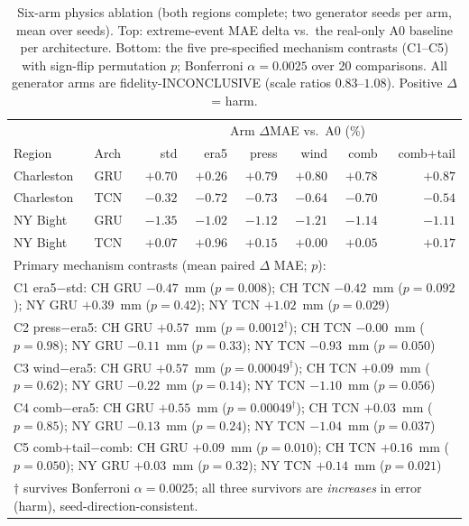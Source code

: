 \begin{table}[t]
\centering
\caption{Six-arm physics ablation (both regions complete; two generator
seeds per arm, mean over seeds). Top: extreme-event MAE delta vs.\ the
real-only A0 baseline per architecture. Bottom: the five pre-specified
mechanism contrasts (C1--C5) with sign-flip permutation $p$; Bonferroni
$\alpha=0.0025$ over 20 comparisons. All generator arms are fidelity-INCONCLUSIVE
(scale ratios $0.83$--$1.08$). Positive $\Delta$ = harm.}
\label{tab:physics-ablation}
\small
\begin{tabular}{llrrrrrr}
\toprule
& & \multicolumn{6}{c}{Arm $\Delta$MAE vs.\ A0 (\%)} \\
Region & Arch & std & era5 & press & wind & comb & comb+tail \\
\midrule
Charleston & GRU & $+0.70$ & $+0.26$ & $+0.79$ & $+0.80$ & $+0.78$ & $+0.87$ \\
Charleston & TCN & $-0.32$ & $-0.72$ & $-0.73$ & $-0.64$ & $-0.70$ & $-0.54$ \\
NY Bight   & GRU & $-1.35$ & $-1.02$ & $-1.12$ & $-1.21$ & $-1.14$ & $-1.11$ \\
NY Bight   & TCN & $+0.07$ & $+0.96$ & $+0.15$ & $+0.00$ & $+0.05$ & $+0.17$ \\
\midrule
\multicolumn{8}{l}{Primary mechanism contrasts (mean paired $\Delta$ MAE; $p$):}\\
\multicolumn{8}{l}{C1 era5$-$std: CH GRU $-0.47$~mm ($p{=}0.008$); CH TCN $-0.42$~mm ($p{=}0.092$); NY GRU $+0.39$~mm ($p{=}0.42$); NY TCN $+1.02$~mm ($p{=}0.029$)}\\
\multicolumn{8}{l}{C2 press$-$era5: CH GRU $+0.57$~mm ($p{=}0.0012^{\dagger}$); CH TCN $-0.00$~mm ($p{=}0.98$); NY GRU $-0.11$~mm ($p{=}0.33$); NY TCN $-0.93$~mm ($p{=}0.050$)}\\
\multicolumn{8}{l}{C3 wind$-$era5: CH GRU $+0.57$~mm ($p{=}0.00049^{\dagger}$); CH TCN $+0.09$~mm ($p{=}0.62$); NY GRU $-0.22$~mm ($p{=}0.14$); NY TCN $-1.10$~mm ($p{=}0.056$)}\\
\multicolumn{8}{l}{C4 comb$-$era5: CH GRU $+0.55$~mm ($p{=}0.00049^{\dagger}$); CH TCN $+0.03$~mm ($p{=}0.85$); NY GRU $-0.13$~mm ($p{=}0.24$); NY TCN $-1.04$~mm ($p{=}0.037$)}\\
\multicolumn{8}{l}{C5 comb+tail$-$comb: CH GRU $+0.09$~mm ($p{=}0.010$); CH TCN $+0.16$~mm ($p{=}0.050$); NY GRU $+0.03$~mm ($p{=}0.32$); NY TCN $+0.14$~mm ($p{=}0.021$)}\\
\bottomrule
\multicolumn{8}{l}{\footnotesize $\dagger$ survives Bonferroni $\alpha=0.0025$; all three survivors are \emph{increases} in error (harm), seed-direction-consistent.}\\
\end{tabular}
\end{table}

